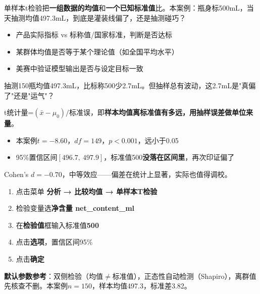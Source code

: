 \begin{algointro}
单样本t检验把\textbf{一组数据的均值}和\textbf{一个已知标准值}比。本案例：瓶身标500mL，当天抽测均值497.3mL，到底是灌装线偏了，还是抽测碰巧？
\end{algointro}

\begin{algoscene}
\begin{itemize}
    \item 产品实际指标 vs 标称值/国家标准，判断是否达标
    \item 某群体均值是否等于某个理论值（如全国平均水平）
    \item 美赛中验证模型输出是否与设定目标一致
\end{itemize}
\end{algoscene}

\begin{algoprinciple}
抽测150瓶均值497.3mL，比标称500少2.7mL。但抽样总有波动，这2.7mL是"真偏了"还是"运气"？

t统计量=$(\bar{x}-\mu_0)/$标准误，即\textbf{样本均值离标准值有多远，用抽样误差做单位来量}。
\begin{itemize}
    \item 本案例$t=-8.60$，$df=149$，$p<0.001$，远小于0.05
    \item 95\%置信区间$[496.7,\ 497.9]$，标准值500\textbf{没落在区间里}，再次印证偏了
\end{itemize}

Cohen's $d=-0.70$，中等效应——偏差在统计上显著，实际也值得调校。
\end{algoprinciple}

\begin{algosposs}
\begin{enumerate}
    \item 点击菜单 \textbf{分析 → 比较均值 → 单样本T检验}
    \item 检验变量选\textbf{净含量 net\_content\_ml}
    \item 在\textbf{检验值}框输入标准值\textbf{500}
    \item 点击\textbf{选项}，置信区间95\%
    \item 点击\textbf{确定}
\end{enumerate}

\textbf{默认参数参考}：双侧检验（均值$\neq$标准值），正态性自动检测（Shapiro），离群值先核查不删。本案例$n=150$，样本均值497.3，标准差3.82。
\end{algosposs}

